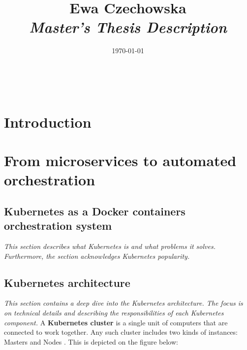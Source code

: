 \documentclass[12pt]{article}
\title{
{\small Ewa Czechowska } \\
\bf\textit{ Master’s Thesis Description } \\
\vspace{4cm}}
\date{\today}
\begin{document}
\maketitle
~\vspace{8cm}
\newpage
\thispagestyle{empty}

\section{Introduction}
\section{From microservices to automated orchestration}
\subsection{Kubernetes as a Docker containers orchestration system}
\textit{This section describes what Kubernetes is and what problems it solves. Furthermore, the section acknowledges Kubernetes popularity.}

\subsection{Kubernetes architecture}
\textit{This section contains a deep dive into the Kubernetes architecture. The focus is on technical details and describing the responsibilities of each Kubernetes component.}
A \textbf{Kubernetes cluster} is a single unit of computers that are connected to work together. Any such cluster includes two kinds of instances: Masters and Nodes \cite{k8s-cluster}. This is depicted on the figure below:


\printbibliography
\end{document}
